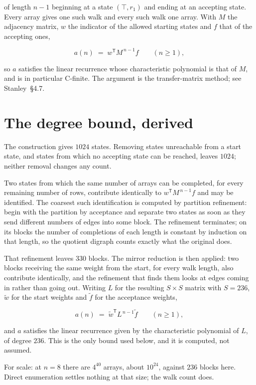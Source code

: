 \documentclass[11pt]{article}
\theoremstyle{definition}
\begin{document}
of length $n-1$ beginning at a state $(\top,r_1)$ and ending at an accepting state. Every array gives one such walk and every such walk one array. With $M$ the adjacency matrix, $w$ the indicator of the allowed starting states and $f$ that of the accepting ones,

\[a(n) \;=\; w^{\mathsf T} M^{\,n-1} f \qquad (n \ge 1),\]

so $a$ satisfies the linear recurrence whose characteristic polynomial is that of $M$, and is in particular C-finite. The argument is the transfer-matrix method; see Stanley~\S4.7.

\section{The degree bound, derived}

The construction gives $1024$ states. Removing states unreachable from a start state, and states from which no accepting state can be reached, leaves $1024$; neither removal changes any count.

Two states from which the same number of arrays can be completed, for every remaining number of rows, contribute identically to $w^{\mathsf T}M^{\,n-1}f$ and may be identified. The coarsest such identification is computed by partition refinement: begin with the partition by acceptance and separate two states as soon as they send different numbers of edges into some block. The refinement terminates; on its blocks the number of completions of each length is constant by induction on that length, so the quotient digraph counts exactly what the original does.

That refinement leaves $330$ blocks. The mirror reduction is then applied: two blocks receiving the same weight from the start, for every walk length, also contribute identically, and the refinement that finds them looks at edges coming in rather than going out. Writing $L$ for the resulting $S \times S$ matrix with $S = 236$, $\tilde w$ for the start weights and $\tilde f$ for the acceptance weights,

\[a(n) \;=\; \tilde w^{\mathsf T} L^{\,n-1} \tilde f \qquad (n \ge 1),\]

and $a$ satisfies the linear recurrence given by the characteristic polynomial of $L$, of degree $236$. This is the only bound used below, and it is computed, not assumed.

For scale: at $n = 8$ there are $4^{40}$ arrays, about $10^{24}$, against $236$ blocks here. Direct enumeration settles nothing at that size; the walk count does.
\end{document}

